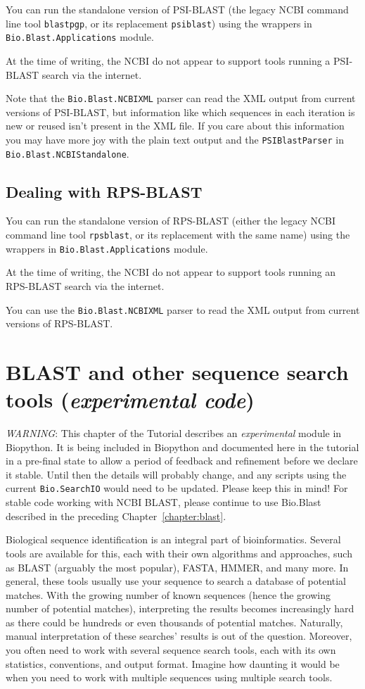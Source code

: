 \documentclass{report}
\begin{document}
You can run the standalone version of PSI-BLAST (the legacy NCBI command line
tool \verb|blastpgp|, or its replacement \verb|psiblast|) using the wrappers
in \verb|Bio.Blast.Applications| module.

At the time of writing, the NCBI do not appear to support tools running a
PSI-BLAST search via the internet.

Note that the \verb|Bio.Blast.NCBIXML| parser can read the XML output from
current versions of PSI-BLAST, but information like which sequences in each
iteration is new or reused isn't present in the XML file.
If you care about this information you may have more joy with the plain text
output and the \verb|PSIBlastParser| in \verb|Bio.Blast.NCBIStandalone|.

\section{Dealing with RPS-BLAST}

You can run the standalone version of RPS-BLAST (either the legacy NCBI
command line tool \verb|rpsblast|, or its replacement with the same name)
using the wrappers in \verb|Bio.Blast.Applications| module.

At the time of writing, the NCBI do not appear to support tools running an
RPS-BLAST search via the internet.

You can use the \verb|Bio.Blast.NCBIXML| parser to read the XML output from
current versions of RPS-BLAST.


\chapter{BLAST and other sequence search tools (\textit{experimental code})}
\label{chapter:searchio}

\emph{WARNING}: This chapter of the Tutorial describes an \emph{experimental}
module in Biopython. It is being included in Biopython and documented
here in  the tutorial in a pre-final state to allow a period of feedback
and refinement before we declare it stable. Until then the details will
probably change, and any scripts using the current \verb|Bio.SearchIO|
would need to be updated. Please keep this in mind! For stable code
working with NCBI BLAST, please continue to use Bio.Blast described
in the preceding Chapter~\ref{chapter:blast}.

Biological sequence identification is an integral part of bioinformatics.
Several tools are available for this, each with their own algorithms and
approaches, such as BLAST (arguably the most popular), FASTA, HMMER, and many
more. In general, these tools usually use your sequence to search a database of
potential matches. With the growing number of known sequences (hence the
growing number of potential matches), interpreting the results becomes
increasingly hard as there could be hundreds or even thousands of potential
matches. Naturally, manual interpretation of these searches' results is out of
the question. Moreover, you often need to work with several sequence search
tools, each with its own statistics, conventions, and output format. Imagine how
daunting it would be when you need to work with multiple sequences using
multiple search tools.
\end{document}
